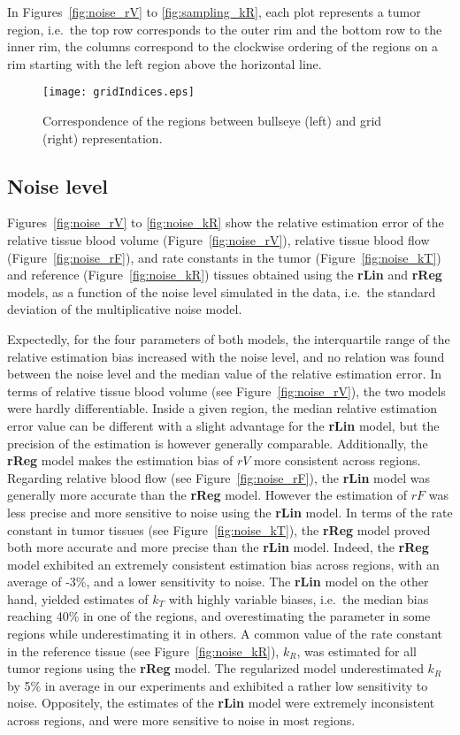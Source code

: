 In Figures~\ref{fig:noise_rV} to \ref{fig:sampling_kR}, each plot represents a tumor region, i.e.~the top row corresponds to the outer rim and the bottom row to the inner rim, the columns correspond to the clockwise ordering of the regions on a rim starting with the left region above the horizontal line.

\begin{figure}
\texttt{[image: gridIndices.eps]}
\caption{Correspondence of the regions between bullseye (left) and grid (right) representation.}
\label{fig:gridIndices}
\end{figure}
\FloatBarrier

\subsection{Noise level}
Figures~\ref{fig:noise_rV} to \ref{fig:noise_kR} show the relative estimation error of the relative tissue blood volume (Figure~\ref{fig:noise_rV}), relative tissue blood flow (Figure~\ref{fig:noise_rF}), and rate constants in the tumor (Figure~\ref{fig:noise_kT}) and reference  (Figure~\ref{fig:noise_kR}) tissues obtained using the \textbf{rLin} and \textbf{rReg} models, as a function of the noise level simulated in the data, i.e.~the standard deviation of the multiplicative noise model.

Expectedly, for the four parameters of both models, the interquartile range of the relative estimation bias increased with the noise level, and no relation was found between the noise level and the median value of the relative estimation error.
In terms of relative tissue blood volume (see Figure~\ref{fig:noise_rV}), the two models were hardly differentiable.
Inside a given region, the median relative estimation error value can be different with a slight advantage for the \textbf{rLin} model, but the precision of the estimation is however generally comparable.
Additionally, the \textbf{rReg} model makes the estimation bias of $rV$ more consistent across regions.
Regarding relative blood flow (see Figure~\ref{fig:noise_rF}), the \textbf{rLin} model was generally more accurate than the \textbf{rReg} model. 
However the estimation of $rF$ was less precise and more sensitive to noise using the \textbf{rLin} model.
In terms of the rate constant in tumor tissues (see Figure~\ref{fig:noise_kT}), the \textbf{rReg} model proved both more accurate and more precise than the \textbf{rLin} model.
Indeed, the \textbf{rReg} model exhibited an extremely consistent estimation bias across regions, with an average of -3\%, and a lower sensitivity to noise.
The \textbf{rLin} model on the other hand, yielded estimates of $k_T$ with highly variable biases, i.e.~the median bias reaching 40\% in one of the regions, and overestimating the parameter in some regions while underestimating it in others.
A common value of the rate constant in the reference tissue (see Figure~\ref{fig:noise_kR}), $k_R$, was estimated for all tumor regions using the \textbf{rReg} model.
The regularized model underestimated $k_R$ by 5\% in average in our experiments and exhibited a rather low sensitivity to noise. 
Oppositely, the estimates of the \textbf{rLin} model were extremely inconsistent across regions, and were more sensitive to noise in most regions.

